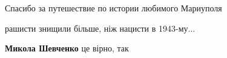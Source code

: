  
 
 
 
 

\qqSecCmt


Спасибо за путешествие по истории любимого Мариуполя


рашисти знищили більше, ніж нацисти в 1943-му...

\begin{itemize} %
\textbf{Микола Шевченко} це вірно, так
\end{itemize} %
